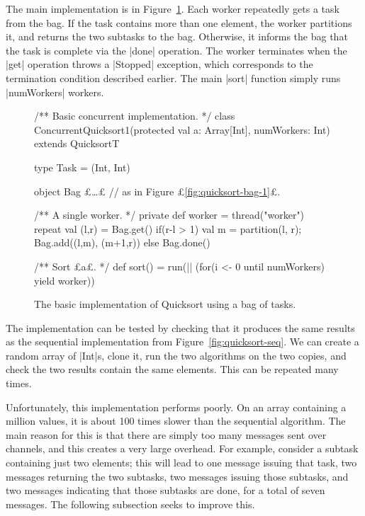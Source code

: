 The main implementation is in Figure~\ref{fig:quicksort-bag-of-tasks-1}.  Each
worker repeatedly gets a task from the bag.  If the task contains more than
one element, the worker partitions it, and returns the two subtasks to the
bag.  Otherwise, it informs the bag that the task is complete via the |done|
operation.  The worker terminates when the |get| operation throws a |Stopped|
exception, which corresponds to the termination condition described earlier.
The main |sort| function simply runs |numWorkers| workers.  


\begin{figure}
\begin{scala}
/** Basic concurrent implementation. */
class ConcurrentQuicksort1(protected val a: Array[Int], numWorkers: Int)
    extends QuicksortT{
  type Task = (Int, Int)

  object Bag{
    £\ldots£ // as in Figure £\ref{fig:quicksort-bag-1}£.
  }

  /** A single worker. */
  private def worker = thread("worker"){
    repeat{
      val (l,r) = Bag.get()
      if(r-l > 1){ val m = partition(l, r); Bag.add((l,m), (m+1,r)) }
      else Bag.done()
    }
  }

  /** Sort £a£. */
  def sort() = run(|| (for(i <- 0 until numWorkers) yield worker))
}
\end{scala}
\caption{The basic implementation of Quicksort using a bag of tasks.}
\label{fig:quicksort-bag-of-tasks-1}
\end{figure}


The implementation can be tested by checking that it produces the same results
as the sequential implementation from Figure~\ref{fig:quicksort-seq}.  We can
create a random array of |Int|s, clone it, run the two algorithms on the two
copies, and check the two results contain the same elements.  This can be
repeated many times.

Unfortunately, this implementation performs poorly.  On an array containing a
million values, it is about 100 times slower than the sequential algorithm.
The main reason for this is that there are simply too many messages sent over
channels, and this creates a very large overhead.  For example, consider a
subtask containing just two elements; this will lead to one message issuing
that task, two messages returning the two subtasks, two messages issuing those
subtasks, and two messages indicating that those subtasks are done, for a
total of seven messages.  The following subsection seeks to improve this.


